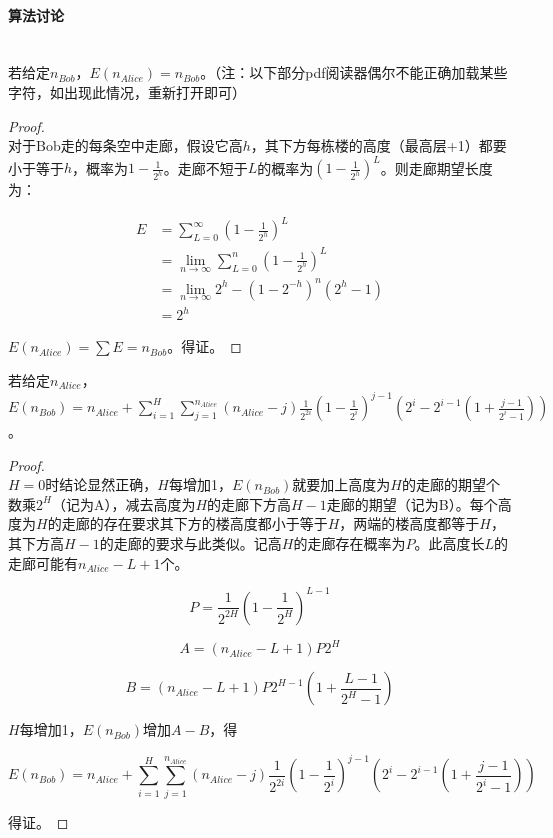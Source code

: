 \documentclass[UTF8]{ctexart}
\newcommand{\myparagraph}[1]{\paragraph{#1}\mbox{}\\}
\theoremstyle{nonumberplain}
\newtheorem{proof}{\hspace{1em}证明：}
\begin{document}
		\myparagraph{算法讨论}
			
			若给定$n_{Bob}$，$E(n_{Alice})=n_{Bob}$。（注：以下部分pdf阅读器偶尔不能正确加载某些字符，如出现此情况，重新打开即可）
			
			\begin{proof}\mbox{}\\
			
				对于Bob走的每条空中走廊，假设它高$h$，其下方每栋楼的高度（最高层+1）都要小于等于$h$，概率为$1-\frac{1}{2^h}$。走廊不短于$L$的概率为$(1-\frac{1}{2^h})^L$。则走廊期望长度为：
				
				$$\begin{aligned}
					E&=\sum_{L=0}^\infty(1-\frac{1}{2^h})^L\\
					 &=\lim_{n \to \infty} \sum_{L=0}^n(1-\frac{1}{2^h})^L\\
					 &=\lim_{n \to \infty} 2^h-(1-2^{-h})^n(2^h-1)\\
					 &=2^h
				\end{aligned}$$
				
				$E(n_{Alice})=\sum E=n_{Bob}$。得证。
			
			\end{proof}
			
			若给定$n_{Alice}$，$E(n_{Bob})=n_{Alice}+\sum_{i=1}^{H}\sum_{j=1}^{n_{Alice}}(n_{Alice}-j)\frac{1}{2^{2i}}(1-\frac{1}{2^i})^{j-1}(2^i-2^{i-1}(1+\frac{j-1}{2^i-1}))$。
			
			\begin{proof}\mbox{}\\
			
				$H=0$时结论显然正确，$H$每增加1，$E(n_{Bob})$就要加上高度为$H$的走廊的期望个数乘$2^H$（记为A），减去高度为$H$的走廊下方高$H-1$走廊的期望（记为B）。每个高度为$H$的走廊的存在要求其下方的楼高度都小于等于$H$，两端的楼高度都等于$H$，其下方高$H-1$的走廊的要求与此类似。记高$H$的走廊存在概率为$P$。此高度长$L$的走廊可能有$n_{Alice}-L+1$个。
				
				$$P=\frac{1}{2^{2H}}(1-\frac{1}{2^H})^{L-1}$$
				
				$$A=(n_{Alice}-L+1)P2^H$$
				
				$$B=(n_{Alice}-L+1)P2^{H-1}(1+\frac{L-1}{2^H-1})$$
				
				$H$每增加1，$E(n_{Bob})$增加$A-B$，得
				
				$$E(n_{Bob})=n_{Alice}+\sum_{i=1}^{H}\sum_{j=1}^{n_{Alice}}(n_{Alice}-j)\frac{1}{2^{2i}}(1-\frac{1}{2^i})^{j-1}(2^i-2^{i-1}(1+\frac{j-1}{2^i-1}))$$
				
				得证。
			
			\end{proof}
			
\end{document}
